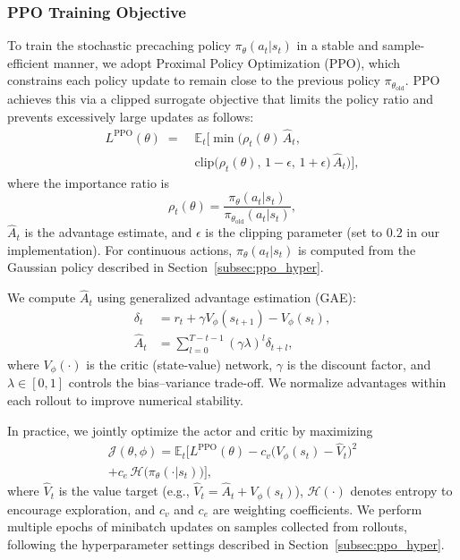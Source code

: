 \subsubsection{PPO Training Objective}
\label{subsubsec:ppo_objective}
To train the stochastic precaching policy $\pi_\theta(a_t|s_t)$ in a stable and sample-efficient manner, we adopt Proximal Policy Optimization (PPO), which constrains each policy update to remain close to the previous policy $\pi_{\theta_{\text{old}}}$. 
PPO achieves this via a clipped surrogate objective that limits the policy ratio and prevents excessively large updates as follows:
\begin{align}
L^{\text{PPO}}(\theta) \;=\; & \mathbb{E}_t \Big[ \min \!\big( \rho_t(\theta)\,\hat{A}_t, \nonumber \\
& \text{clip}\big(\rho_t(\theta),\,1-\epsilon,\,1+\epsilon\big)\,\hat{A}_t \big) \Big],
\label{eq:ppo-clip}
\end{align}
where the importance ratio is
\begin{equation}
\rho_t(\theta)=\frac{\pi_\theta(a_t|s_t)}{\pi_{\theta_{\text{old}}}(a_t|s_t)},
\end{equation}
$\hat{A}_t$ is the advantage estimate, and $\epsilon$ is the clipping parameter (set to $0.2$ in our implementation). 
For continuous actions, $\pi_\theta(a_t|s_t)$ is computed from the Gaussian policy described in Section~\ref{subsec:ppo_hyper}.

We compute $\hat{A}_t$ using generalized advantage estimation (GAE):
\begin{align}
\delta_t &= r_t + \gamma V_\phi(s_{t+1}) - V_\phi(s_t), \label{eq:td_error}\\
\hat{A}_t &= \sum_{l=0}^{T-t-1} (\gamma\lambda)^l \delta_{t+l},
\label{eq:gae}
\end{align}
where $V_\phi(\cdot)$ is the critic (state-value) network, $\gamma$ is the discount factor, and $\lambda\in[0,1]$ controls the bias--variance trade-off. 
We normalize advantages within each rollout to improve numerical stability.

In practice, we jointly optimize the actor and critic by maximizing
\begin{align}
\mathcal{J}(\theta,\phi) =
\mathbb{E}_t\Big[
L^{\text{PPO}}(\theta)
- c_v\big(V_\phi(s_t)-\hat{V}_t\big)^2 \nonumber \\
+ c_e\,\mathcal{H}\big(\pi_\theta(\cdot|s_t)\big)
\Big],
\label{eq:ppo_total}
\end{align}
where $\hat{V}_t$ is the value target (e.g., $\hat{V}_t=\hat{A}_t+V_\phi(s_t)$), $\mathcal{H}(\cdot)$ denotes entropy to encourage exploration, and $c_v$ and $c_e$ are weighting coefficients. 
We perform multiple epochs of minibatch updates on samples collected from rollouts, following the hyperparameter settings described in Section~\ref{subsec:ppo_hyper}.

